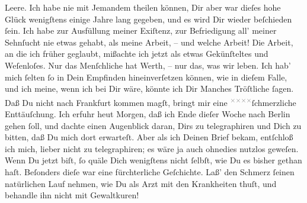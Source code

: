 \begin{ledgroupsized}[t]{13cm}
               Leere. Ich habe nie mit Jemandem theilen können, Dir aber war dieſes hohe Glück
               wenigſtens einige Jahre lang gegeben, und es wird Dir \strikeout{\textcolor{gray}{wie}} wieder beſchieden ſein. Ich habe zur Ausfüllung meiner Exiſtenz, zur
               Befriedigung all’ meiner Sehnſucht nie etwas gehabt, als meine Arbeit, – und welche
               Arbeit! Die Arbeit, an die ich früher geglaubt, mißachte ich jetzt als etwas
               Gekünſteltes und Weſenloſes. Nur das Menſchliche hat Werth, – nur das, was wir
               leben.\pend
           \pstart
           Ich hab’ mich ſelten ſo in Dein \strikeout{\textcolor{gray}{×}}{ }{\pb}Empfinden hineinverſetzen können, wie \strikeout{\textcolor{gray}{gege}} in dieſem Falle, und ich meine, wenn ich bei Dir wäre, könnte ich Dir \strikeout{\textcolor{gray}{m}} Manches Tröſtliche ſagen. Daß Du nicht nach Frankfurt kommen magſt, bringt mir eine \substVorne{}\textsuperscript{\textcolor{gray}{×}\-\textcolor{gray}{×}\-\textcolor{gray}{×}\-\textcolor{gray}{×}}\substDazwischen{}ſchmerzliche\substHinten{} Enttäuſchung. Ich erfuhr heut{ }Morgen, daß ich Ende dieſer Woche nach Berlin gehen ſoll, und dachte einen Augenblick daran, Dirs zu telegraphiren
               und \introOben{}Dich\introOben{} zu bitten,  daß
               Du mich dort erwarteſt. Aber  als ich Deinen Brief bekam, entſchloß ich mich, lieber nicht zu telegraphiren;
               es wäre ja auch ohnedies nutzlos geweſen.\pend
           \pstart
           Wenn Du jetzt \label{K_L02874-33v}\label{K_L02874-33h}{ } biſt, ſo quäle Dich
               wenigſtens nicht ſelbſt, wie Du es bisher gethan haſt. Beſonders {\pb}dieſe \label{K_L02874-23v}\label{K_L02874-23h} war eine fürchterliche Geſchichte. Laß’ den Schmerz ſeinen natürlichen Lauf
               nehmen, wie Du als Arzt mit den Krankheiten thuſt, und behandle ihn nicht mit
               Gewaltkuren!\pend

\end{ledgroupsized}
